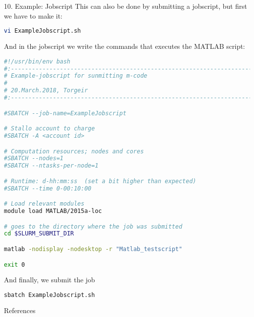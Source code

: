 \documentclass{beamer}
\begin{document}
\begin{frame}[fragile, allowframebreaks=.95, t]{10. Example: Jobscript}
This can also be done by submitting a jobscript, but first we have to make it:
\begin{lstlisting}[backgroundcolor = \color{light-gray}, language=bash]
vi ExampleJobscript.sh
\end{lstlisting}
And in the jobscript we write the commands that executes the MATLAB script:
\begin{lstlisting}[backgroundcolor = \color{light-gray}, language=bash]
#!/usr/bin/env bash
#:--------------------------------------------------------------------------
# Example-jobscript for sunmitting m-code
#
# 20.March.2018, Torgeir
#:-------------------------------------------------------------------------- 

#SBATCH --job-name=ExampleJobscript

# Stallo account to charge
#SBATCH -A <account id>

# Computation resources; nodes and cores
#SBATCH --nodes=1
#SBATCH --ntasks-per-node=1

# Runtime: d-hh:mm:ss  (set a bit higher than expected)
#SBATCH --time 0-00:10:00

# Load relevant modules
module load MATLAB/2015a-loc

# goes to the directory where the job was submitted
cd $SLURM_SUBMIT_DIR

matlab -nodisplay -nodesktop -r "Matlab_testscript"

exit 0
\end{lstlisting}
And finally, we submit the job 
\begin{lstlisting}[backgroundcolor = \color{light-gray}, language=bash]
sbatch ExampleJobscript.sh 
\end{lstlisting}
\end{frame}


\begin{frame}[fragile,allowframebreaks=1, t]{References}


\end{frame}
\end{document}
